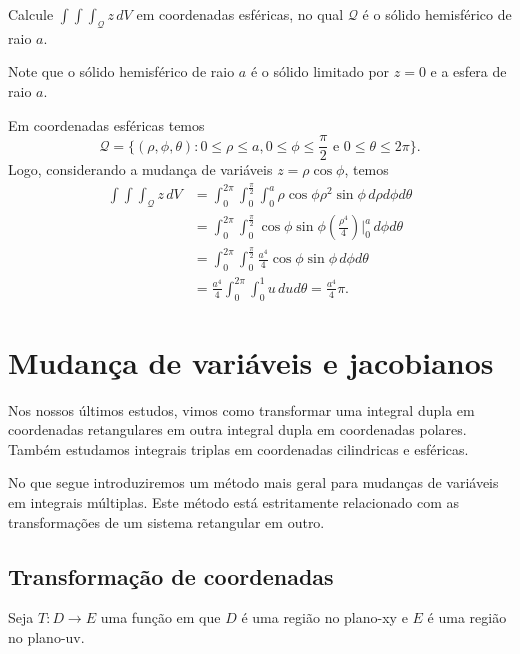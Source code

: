 \begin{example}
    Calcule \(\int\int\int_\mathcal{Q} z\, dV\) em coordenadas esféricas, no qual \(\mathcal{Q}\) é o sólido hemisférico de raio \(a\).

    Note que o sólido hemisférico de raio \(a\) é o sólido limitado por \(z=0\) e a esfera de raio \(a\).

    Em coordenadas esféricas temos \[\mathcal{Q} = \{(\rho,\phi,\theta) : 0\leq \rho \leq a, 0\leq\phi\leq\frac{\pi}{2} \text{ e } 0\leq \theta\leq 2\pi\}.\] Logo, considerando a mudança de variáveis \(z = \rho\cos\phi\), temos
        \begin{align*}
            \int\int\int_\mathcal{Q} z\, dV
                & = \int_0^{2\pi} \int_0^{\frac{\pi}{2}} \int_0^a \rho \cos\phi \rho^2 \sin\phi\, d\rho d\phi d\theta \\
                & = \int_0^{2\pi} \int_0^{\frac{\pi}{2}} \cos\phi\sin\phi\left( \frac{\rho^4}{4} \right)\bigg|_0^a \, d\phi d\theta \\
                & = \int_0^{2\pi} \int_0^{\frac{\pi}{2}}\frac{a^4}{4} \cos\phi \sin\phi\, d\phi d\theta \\
                & = \frac{a^4}{4} \int_0^{2\pi} \int_0^1 u \, du d\theta = \frac{a^4}{4} \pi.
        \end{align*}
\end{example}

\section{Mudança de variáveis e jacobianos}

Nos nossos últimos estudos, vimos como transformar uma integral dupla em coordenadas retangulares em outra integral dupla em coordenadas polares. Também estudamos integrais triplas em coordenadas cilindricas e esféricas.

No que segue introduziremos um método mais geral para mudanças de variáveis em integrais múltiplas. Este método está estritamente relacionado com as transformações de um sistema retangular em outro.

\subsection{Transformação de coordenadas}

Seja \(T: D \to E\) uma função em que \(D\) é uma região no plano-xy e \(E\) é uma região no plano-uv.

